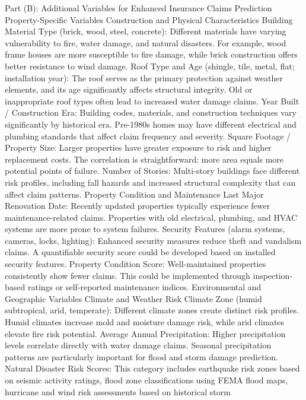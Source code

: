 \documentclass[8pt, twocolumn]{extarticle}
\begin{document}
    Part (B): Additional Variables for Enhanced Insurance Claims Prediction
Property-Specific Variables Construction and Physical Characteristics
Building Material Type (brick, wood, steel, concrete): Different
materials have varying vulnerability to fire, water damage, and natural
disasters. For example, wood frame houses are more susceptible to fire
damage, while brick construction offers better resistance to wind
damage. Roof Type and Age (shingle, tile, metal, flat; installation
year): The roof serves as the primary protection against weather
elements, and its age significantly affects structural integrity. Old or
inappropriate roof types often lead to increased water damage claims.
Year Built / Construction Era: Building codes, materials, and
construction techniques vary significantly by historical era. Pre-1980s
homes may have different electrical and plumbing standards that affect
claim frequency and severity. Square Footage / Property Size: Larger
properties have greater exposure to risk and higher replacement costs.
The correlation is straightforward: more area equals more potential
points of failure. Number of Stories: Multi-story buildings face
different risk profiles, including fall hazards and increased structural
complexity that can affect claim patterns. Property Condition and
Maintenance Last Major Renovation Date: Recently updated properties
typically experience fewer maintenance-related claims. Properties with
old electrical, plumbing, and HVAC systems are more prone to system
failures. Security Features (alarm systems, cameras, locks, lighting):
Enhanced security measures reduce theft and vandalism claims. A
quantifiable security score could be developed based on installed
security features. Property Condition Score: Well-maintained properties
consistently show fewer claims. This could be implemented through
inspection-based ratings or self-reported maintenance indices.
Environmental and Geographic Variables Climate and Weather Risk Climate
Zone (humid subtropical, arid, temperate): Different climate zones
create distinct risk profiles. Humid climates increase mold and moisture
damage risk, while arid climates elevate fire risk potential. Average
Annual Precipitation: Higher precipitation levels correlate directly
with water damage claims. Seasonal precipitation patterns are
particularly important for flood and storm damage prediction. Natural
Disaster Risk Scores: This category includes earthquake risk zones based
on seismic activity ratings, flood zone classifications using FEMA flood
maps, hurricane and wind risk assessments based on historical storm
\end{document}
